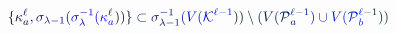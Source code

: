 \documentclass[12pt]{article}
\begin{document}
\makeatletter
\renewcommand*{\@textcolor}[3]{%
  \protect\leavevmode
  \begingroup
    \color#1{#2}#3%
  \endgroup
}
\makeatother
\begin{displaymath}
\mathcolor[RGB]{0,0,15}{\{} \mathcolor[RGB]{0,0,30}{\kappa} _ { \mathcolor[RGB]{0,0,45}{a} } ^ { \mathcolor[RGB]{0,0,60}{\ell} } \mathcolor[RGB]{0,0,75}{,} \mathcolor[RGB]{0,0,90}{\sigma} _ { \mathcolor[RGB]{0,0,105}{\lambda} \mathcolor[RGB]{0,0,120}{-} \mathcolor[RGB]{0,0,135}{1} } \mathcolor[RGB]{0,0,150}{(} \mathcolor[RGB]{0,0,165}{\sigma} _ { \mathcolor[RGB]{0,0,180}{\lambda} } ^ { \mathcolor[RGB]{0,0,195}{-} \mathcolor[RGB]{0,0,210}{1} } \mathcolor[RGB]{0,0,225}{(} \mathcolor[RGB]{0,0,240}{\kappa} _ { \mathcolor[RGB]{0,0,255}{a} } ^ { \mathcolor[RGB]{0,15,0}{\ell} } \mathcolor[RGB]{0,15,15}{)} \mathcolor[RGB]{0,15,30}{)} \mathcolor[RGB]{0,15,45}{\}} \mathcolor[RGB]{0,15,60}{\subset} \mathcolor[RGB]{0,15,75}{\sigma} _ { \mathcolor[RGB]{0,15,90}{\lambda} \mathcolor[RGB]{0,15,105}{-} \mathcolor[RGB]{0,15,120}{1} } ^ { \mathcolor[RGB]{0,15,135}{-} \mathcolor[RGB]{0,15,150}{1} } \mathcolor[RGB]{0,15,165}{(} \mathcolor[RGB]{0,15,180}{V} \mathcolor[RGB]{0,15,195}{(} \mathcal { \mathcolor[RGB]{0,15,210}{K} } ^ { \mathcolor[RGB]{0,15,225}{\ell} \mathcolor[RGB]{0,15,240}{-} \mathcolor[RGB]{0,15,255}{1} } \mathcolor[RGB]{0,30,0}{)} \mathcolor[RGB]{0,30,15}{)} \mathcolor[RGB]{0,30,30}{\setminus} \mathcolor[RGB]{0,30,45}{(} \mathcolor[RGB]{0,30,60}{V} \mathcolor[RGB]{0,30,75}{(} \mathcal { \mathcolor[RGB]{0,30,90}{P} } _ { \mathcolor[RGB]{0,30,105}{a} } ^ { \mathcolor[RGB]{0,30,120}{\ell} \mathcolor[RGB]{0,30,135}{-} \mathcolor[RGB]{0,30,150}{1} } \mathcolor[RGB]{0,30,165}{)} \mathcolor[RGB]{0,30,180}{\cup} \mathcolor[RGB]{0,30,195}{V} \mathcolor[RGB]{0,30,210}{(} \mathcal { \mathcolor[RGB]{0,30,225}{P} } _ { \mathcolor[RGB]{0,30,240}{b} } ^ { \mathcolor[RGB]{0,30,255}{\ell} \mathcolor[RGB]{0,45,0}{-} \mathcolor[RGB]{0,45,15}{1} } \mathcolor[RGB]{0,45,30}{)} \mathcolor[RGB]{0,45,45}{)}
\end{displaymath}
\end{document}
